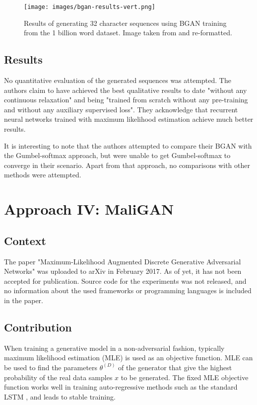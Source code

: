 \documentclass[a4paper,conference]{IEEEtran}
\begin{document}
   \begin{figure}[thpb]
      \centering
      \texttt{[image: images/bgan-results-vert.png]}
      \caption{Results of generating 32 character sequences using BGAN training from the 1 billion word dataset. Image taken from \cite{c17} and re-formatted.}
      \label{fig:bgan-results}
   \end{figure}

\subsection{Results}
No quantitative evaluation of the generated sequences was attempted. The authors claim to have achieved the best qualitative results to date "without any continuous relaxation" and being "trained from scratch without any pre-training and without any auxiliary supervised loss". They acknowledge that recurrent neural networks trained with maximum likelihood estimation achieve much better results.

It is interesting to note that the authors attempted to compare their BGAN with the Gumbel-softmax approach, but were unable to get Gumbel-softmax to converge in their scenario. Apart from that approach, no comparisons with other methods were attempted.

\section{Approach IV: MaliGAN}
\subsection{Context}
The paper "Maximum-Likelihood Augmented Discrete Generative Adversarial Networks" \cite{c23} was uploaded to arXiv in February 2017. As of yet, it has not been accepted for publication. Source code for the experiments was not released, and no information about the used frameworks or programming languages is included in the paper. 

\subsection{Contribution}
When training a generative model in a non-adversarial fashion, typically maximum likelihood estimation (MLE) is used as an objective function. MLE can be used to find the parameters $\theta^{(D)}$ of the generator that give the highest probability of the real data samples $x$ to be generated. The fixed MLE objective function works well in training auto-regressive methods such as the standard LSTM \cite{c9}, and leads to stable training. 
\end{document}
